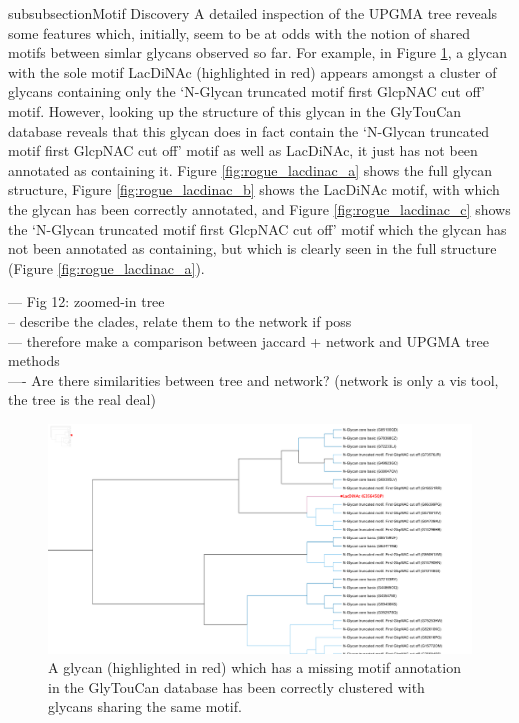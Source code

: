 \documentclass[12pt,a4paper]{article}
\begin{document}
subsubsection{Motif Discovery}
A detailed inspection of the UPGMA tree reveals some features which, initially, seem to be at odds with the notion of shared motifs between simlar glycans observed so far. For example, in Figure \ref{fig:full_tree_LacDiNAc}, a glycan with the sole motif LacDiNAc (highlighted in red) appears amongst a cluster of glycans containing only the `N-Glycan truncated motif first GlcpNAC cut off' motif. However, looking up the structure of this glycan in the GlyTouCan database reveals that this glycan does in fact contain the `N-Glycan truncated motif first GlcpNAC cut off' motif as well as LacDiNAc, it just has not been annotated as containing it. Figure \ref{fig:rogue_lacdinac_a} shows the full glycan structure, Figure \ref{fig:rogue_lacdinac_b} shows the LacDiNAc motif, with which the glycan has been correctly annotated, and Figure \ref{fig:rogue_lacdinac_c} shows the `N-Glycan truncated motif first GlcpNAC cut off' motif which the glycan has not been annotated as containing, but which is clearly seen in the full structure (Figure \ref{fig:rogue_lacdinac_a}).

--- Fig 12: zoomed-in tree\\
-- describe the clades, relate them to the network if poss\\
--- therefore make a comparison between jaccard + network and UPGMA tree methods\\
---- Are there similarities between tree and network? (network is only a vis tool, the tree is the real deal) \\

\begin{figure}
\centering 
\includegraphics[scale=0.3]{trees/rogue_LacDiNAc_in_tree.png} 
\caption{A glycan (highlighted in red) which has a missing motif annotation in the GlyTouCan database has been correctly clustered with glycans sharing the same motif.}
\label{fig:full_tree_LacDiNAc}
\end{figure}
\clearpage
\end{document}
